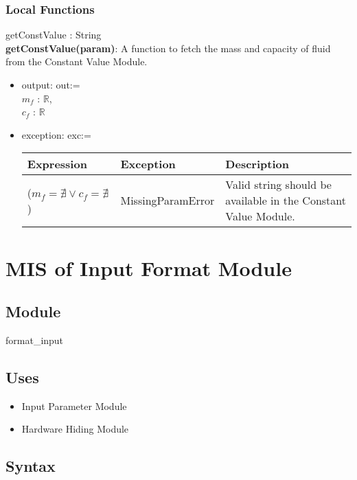 \documentclass[12pt, titlepage]{article}
\begin{document}
\subsubsection{Local Functions}

getConstValue : String  \\ 
\textbf{getConstValue(param)}:  A function to fetch the mass and capacity of fluid from the Constant Value Module. 
\begin{itemize}
    \item  output: out:= \\ $m_f$ : $\mathbb{R}$,  \\ $c_f$ : $\mathbb{R}$
    \item  exception: exc:= \\

 \begin{tabular}{p{5cm} p{3.5cm} p{5.5cm}}
 \hline
 \textbf{Expression} & \textbf{Exception} & \textbf{Description} \\
  \hline
    ($m_f = \nexists \vee c_f = \nexists $) & MissingParamError & Valid string should be available in the Constant Value Module.  \\
    \hline
 \end{tabular}
\end{itemize}

\newpage

\section{MIS of Input Format Module} \label{Input_Format_Module} 

\subsection{Module}

format\_input 

\subsection{Uses}

\begin{itemize}
    \item Input Parameter Module
    \item Hardware Hiding Module
\end{itemize}

\subsection{Syntax}
\end{document}
